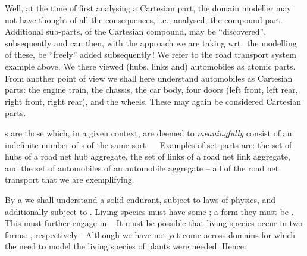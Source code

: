 \begynd
\pind Well, at the time of first analysing a Cartesian part,
\pind the  domain modeller
\pind may not have thought of all the consequences, i.e., analysed,
\pind the compound part.
\pind Additional sub-parts, of the Cartesian compound, may be
      ``discovered'', subsequently
\pind and can then, 
\pind with the approach we are taking wrt.\ the modelling of these,
\pind be ``freely'' added subsequently\,!
\afslut
\afslut
\begynd
\pind We refer to the road transport
  system example above.
\pind We there viewed (hubs, links and) automobiles \nyl as atomic parts.
\pind From another point of view \nyl we shall here understand automobiles \nyl
      as Cartesian parts:
\begynd
\pind the engine train,
\pind the chassis,
\pind the car body,
\pind four doors (left front, left rear, right front, right rear), and
\pind the wheels.
\afslut
\pos{}{\end{multicols}}
\pind These may again be considered Cartesian parts.
\afslut
      \sl
{} \sl 
{}
\begynd
\pind {}s are those which,
\begynd
\pind in a given context, 
\pind are deemed to \textsl{meaningfully} consist of
\begynd
\pind an indefinite number of s
\pind of the same sort \dbsquare\ \ \rm
\afslut
\pind Examples of set parts are: the set of hubs of a road net hub
aggregate, the set of links of a road net link aggregate, and the set
of automobiles of an automobile aggregate -- all of the road net
transport that we are exemplifying.
\afslut

      \sl
{} \sl 
{}
\begynd
\pind By a  we shall understand
\begynd
\pind a solid endurant,
\pind subject to laws of physics, and
\pind additionally subject to . 
\pind Living species
\begynd \LLLL
\pind must have some ;
\pind a form they must be .
\pind This  must further \nyl engage
      in  \rm\dbsquare\
\afslut
\afslut
\afslut 
\pind It must be possible that living species occur in two forms:
\begynd
\pind {}, respectively . 
\pind Although we have not yet come across domains for which \nyl the need
      to model the living species of plants were needed.
\pind Hence:
\afslut

